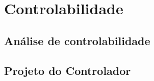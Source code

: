 \section{Controlabilidade}

\subsection{Análise de controlabilidade}

\subsection{Projeto do Controlador}
